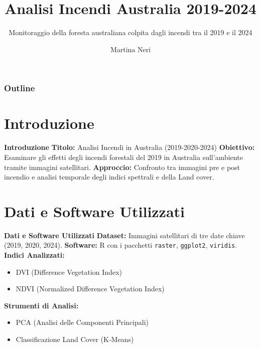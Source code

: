 \documentclass{beamer}
\title{\textbf{\textcolor{verdeScuro}{Analisi Incendi Australia 2019-2024}}}
\subtitle{Monitoraggio della foresta australiana colpita dagli incendi tra il 2019 e il 2024}
\author{Martina Neri}
\begin{document}
\maketitle

\begin{frame}
\frametitle{Outline}
\tableofcontents
\end{frame}

\section{Introduzione}

\begin{frame}{\textbf{Introduzione}}
\textbf{Titolo:} Analisi Incendi in Australia (2019-2020-2024)
\newline
\newline
\textbf{Obiettivo:} Esaminare gli effetti degli incendi forestali del 2019 in Australia sull'ambiente tramite immagini satellitari.
\newline
\newline
\textbf{Approccio:} Confronto tra immagini pre e post incendio e analisi temporale degli indici spettrali e della Land cover.
\end{frame}

\section{Dati e Software Utilizzati}

\begin{frame}{\textbf{Dati e Software Utilizzati}}
\textbf{Dataset:} Immagini satellitari di tre date chiave (2019, 2020, 2024).
\newline
\newline
\textbf{Software:} R con i pacchetti \texttt{raster}, \texttt{ggplot2}, \texttt{viridis}.
\newline
\newline
\textbf{Indici Analizzati:}
\begin{itemize}
    \item DVI (Difference Vegetation Index)
    \item NDVI (Normalized Difference Vegetation Index)
\end{itemize}
\newline
\textbf{Strumenti di Analisi:}
\begin{itemize}
    \item PCA (Analisi delle Componenti Principali)
    \item Classificazione Land Cover (K-Means)
\end{itemize}
\end{frame}
\end{document}
